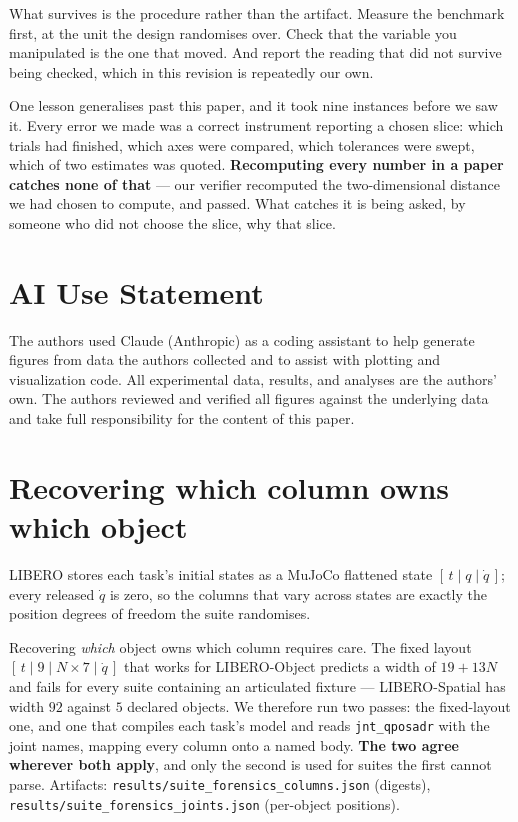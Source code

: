 \documentclass[10pt,twocolumn]{article}
\begin{document}
What survives is the procedure rather than the artifact. Measure the benchmark
first, at the unit the design randomises over. Check that the variable you
manipulated is the one that moved. And report the reading that did not survive
being checked, which in this revision is repeatedly our own.

One lesson generalises past this paper, and it took nine instances before we
saw it. Every error we made was a correct instrument reporting a chosen
slice: which trials had finished, which axes were compared, which tolerances
were swept, which of two estimates was quoted. \textbf{Recomputing every number
in a paper catches none of that} --- our verifier recomputed the two-dimensional
distance we had chosen to compute, and passed. What catches it is being asked,
by someone who did not choose the slice, why that slice.

\section*{AI Use Statement}

The authors used Claude (Anthropic) as a coding assistant to help generate
figures from data the authors collected and to assist with plotting and
visualization code. All experimental data, results, and analyses are the
authors' own. The authors reviewed and verified all figures against the
underlying data and take full responsibility for the content of this paper.

\appendix

\section{Recovering which column owns which object}
\label{app:columns}

LIBERO stores each task's initial states as a MuJoCo flattened state
$[\,t \mid q \mid \dot q\,]$; every released $\dot q$ is zero, so the columns
that vary across states are exactly the position degrees of freedom the suite
randomises.

Recovering \emph{which} object owns which column requires care. The fixed
layout $[\,t \mid 9 \mid N\!\times\!7 \mid \dot q\,]$ that works for
LIBERO-Object predicts a width of $19+13N$ and fails for every suite containing
an articulated fixture --- LIBERO-Spatial has width $92$ against $5$ declared
objects. We therefore run two passes: the fixed-layout one, and one that
compiles each task's model and reads \texttt{jnt\_qposadr} with the joint names,
mapping every column onto a named body. \textbf{The two agree wherever both
apply}, and only the second is used for suites the first cannot parse.
Artifacts: \texttt{results/suite\_forensics\_columns.json} (digests),
\texttt{results/suite\_forensics\_joints.json} (per-object positions).
\end{document}
